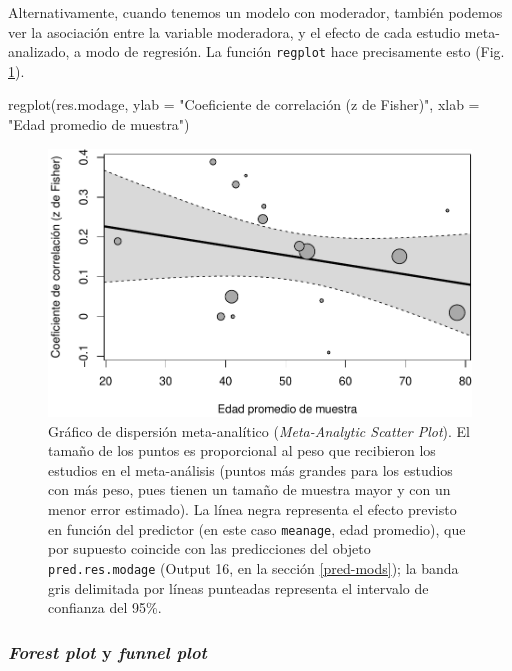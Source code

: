 \documentclass[
  bookmarksnumbered]{article}
\newenvironment{Shaded}{\begin{snugshade}}{\end{snugshade}}
\newcommand{\AttributeTok}[1]{\textcolor[rgb]{0.00,0.34,0.68}{#1}}
\newcommand{\FunctionTok}[1]{\textcolor[rgb]{0.39,0.29,0.61}{#1}}
\newcommand{\NormalTok}[1]{\textcolor[rgb]{0.12,0.11,0.11}{#1}}
\newcommand{\StringTok}[1]{\textcolor[rgb]{0.75,0.01,0.01}{#1}}
\begin{document}
Alternativamente, cuando tenemos un modelo con moderador, también podemos ver la asociación entre la variable moderadora, y el efecto de cada estudio meta-analizado, a modo de regresión. La función \texttt{regplot} hace precisamente esto (Fig. \ref{fig:reg-plot1}).

\begin{Shaded}
\begin{Highlighting}[]
\FunctionTok{regplot}\NormalTok{(res.modage,}
        \AttributeTok{ylab =} \StringTok{"Coeficiente de correlación (z de Fisher)"}\NormalTok{,}
        \AttributeTok{xlab =} \StringTok{"Edad promedio de muestra"}\NormalTok{)}
\end{Highlighting}
\end{Shaded}

\begin{figure}
\centering
\includegraphics{Meta-analysis_files/figure-latex/reg-plot1-1.pdf}
\caption{\label{fig:reg-plot1}Gráfico de dispersión meta-analítico (\emph{Meta-Analytic Scatter Plot}). El tamaño de los puntos es proporcional al peso que recibieron los estudios en el meta-análisis (puntos más grandes para los estudios con más peso, pues tienen un tamaño de muestra mayor y con un menor error estimado). La línea negra representa el efecto previsto en función del predictor (en este caso \texttt{meanage}, edad promedio), que por supuesto coincide con las predicciones del objeto \texttt{pred.res.modage} (Output 16, en la sección \ref{pred-mods}); la banda gris delimitada por líneas punteadas representa el intervalo de confianza del 95\%.}
\end{figure}

\hypertarget{plot-mod}{%
\subsubsection{\texorpdfstring{\emph{Forest plot} y \emph{funnel plot}}{Forest plot y funnel plot}}\label{plot-mod}}
\end{document}
